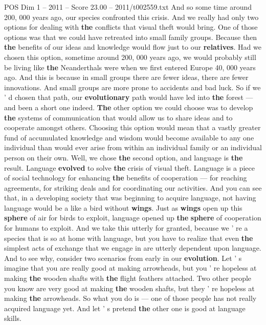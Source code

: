 \begin{textsample}{POS Dim 1 – 2011 – Score 23.00 – 2011/t002559.txt}
And so some time around 200, 000 years ago, our species confronted this crisis.
And we really had only two options for dealing with \textbf{the} conflicts that visual theft would bring.
One of those options was that we could have retreated into small family groups.
Because then \textbf{the} benefits of our ideas and knowledge would flow just to our \textbf{relatives}.
Had we chosen this option, sometime around 200, 000 years ago, we would probably still be living like \textbf{the} Neanderthals were when we first entered Europe 40, 000 years ago.
And this is because in small groups there are fewer ideas, there are fewer innovations.
And small groups are more prone to accidents and bad luck.
So if we ' d chosen that path, our \textbf{evolutionary} path would have led into \textbf{the} forest — and been a short one indeed. \textbf{The} other option we could choose was to develop \textbf{the} systems of communication that would allow us to share ideas and to cooperate amongst others.
Choosing this option would mean that a vastly greater fund of accumulated knowledge and wisdom would become available to any one individual than would ever arise from within an individual family or an individual person on their own.
Well, we chose \textbf{the} second option, and language is \textbf{the} result.
Language \textbf{evolved} to solve \textbf{the} crisis of visual theft.
Language is a piece of social technology for enhancing \textbf{the} benefits of cooperation — for reaching agreements, for striking deals and for coordinating our activities.
And you can see that, in a developing society that was beginning to acquire language, not having language would be a like a bird without \textbf{wings}.
Just as \textbf{wings} open up this \textbf{sphere} of air for birds to exploit, language opened up \textbf{the} \textbf{sphere} of cooperation for humans to exploit.
And we take this utterly for granted, because we ' re a species that is so at home with language, but you have to realize that even \textbf{the} simplest acts of exchange that we engage in are utterly dependent upon language.
And to see why, consider two scenarios from early in our \textbf{evolution}.
Let ' s imagine that you are really good at making arrowheads, but you ' re hopeless at making \textbf{the} wooden shafts with \textbf{the} flight feathers attached.
Two other people you know are very good at making \textbf{the} wooden shafts, but they ' re hopeless at making \textbf{the} arrowheads.
So what you do is — one of those people has not really acquired language yet.
And let ' s pretend \textbf{the} other one is good at language skills.

\end{textsample}
